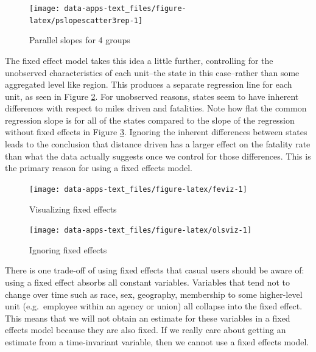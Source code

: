 \documentclass[
]{book}
\begin{document}
\begin{figure}

{\centering \texttt{[image: data-apps-text\_files/figure-latex/pslopescatter3rep-1]} 

}

\caption{Parallel slopes for 4 groups}\label{fig:pslopescatter3rep}
\end{figure}

The fixed effect model takes this idea a little further, controlling for the unobserved characteristics of each unit--the state in this case--rather than some aggregated level like region. This produces a separate regression line for each unit, as seen in Figure \ref{fig:feviz}. For unobserved reasons, states seem to have inherent differences with respect to miles driven and fatalities. Note how flat the common regression slope is for all of the states compared to the slope of the regression without fixed effects in Figure \ref{fig:olsviz}. Ignoring the inherent differences between states leads to the conclusion that distance driven has a larger effect on the fatality rate than what the data actually suggests once we control for those differences. This is the primary reason for using a fixed effects model.

\begin{figure}

{\centering \texttt{[image: data-apps-text\_files/figure-latex/feviz-1]} 

}

\caption{Visualizing fixed effects}\label{fig:feviz}
\end{figure}

\begin{figure}

{\centering \texttt{[image: data-apps-text\_files/figure-latex/olsviz-1]} 

}

\caption{Ignoring fixed effects}\label{fig:olsviz}
\end{figure}

There is one trade-off of using fixed effects that casual users should be aware of: using a fixed effect absorbs all constant variables. Variables that tend not to change over time such as race, sex, geography, membership to some higher-level unit (e.g.~employee within an agency or union) all collapse into the fixed effect. This means that we will not obtain an estimate for these variables in a fixed effects model because they are also fixed. If we really care about getting an estimate from a time-invariant variable, then we cannot use a fixed effects model.
\end{document}
